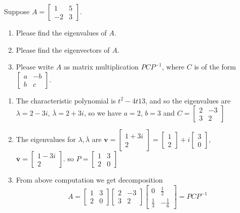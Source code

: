 \documentclass[a4paper,10pt]{article}
\begin{document}
\begin{problem}
Suppose $A=\begin{bmatrix}
1&5\\
-2&3
\end{bmatrix}$.
\begin{enumerate}[label=\alph*)]
\item Please find the eigenvalues of $A$.
\item Please find the eigenvectors of $A$.
\item Please write $A$ as matrix multiplication $PCP^{-1}$, where $C$ is of the form $\begin{bmatrix}
a&-b\\
b&c
\end{bmatrix}$.
\end{enumerate}
\end{problem}

\begin{solution}
\begin{enumerate}[label=\alph*)]
\item The characteristic polynomial is $t^2-4t13$, and so the eigenvalues are $\lambda=2-3i$, $\overline\lambda=2+3i$, so we have $a=2$, $b=3$ and $C=\begin{bmatrix}
2&-3\\3&2
\end{bmatrix}$
\item The eigenvalues for $\lambda,\overline{\lambda}$ are $\mathbf v=\begin{bmatrix}
1+3i\\2
\end{bmatrix}=\begin{bmatrix}
1\\2
\end{bmatrix}+i\begin{bmatrix}
3\\0
\end{bmatrix}$, $\overline{\mathbf v}=\begin{bmatrix}
1-3i\\2
\end{bmatrix}$. so $P=\begin{bmatrix}
1&3\\
2&0
\end{bmatrix}$
\item From above computation we get decomposition
\[
A=\begin{bmatrix}
1&3\\
2&0
\end{bmatrix}\begin{bmatrix}
2&-3\\3&2
\end{bmatrix}\begin{bmatrix}
0&\frac{1}{2}\\
\frac{1}{3}&-\frac{1}{6}
\end{bmatrix}=PCP^{-1}
\]
\end{enumerate}
\end{solution}
\end{document}
